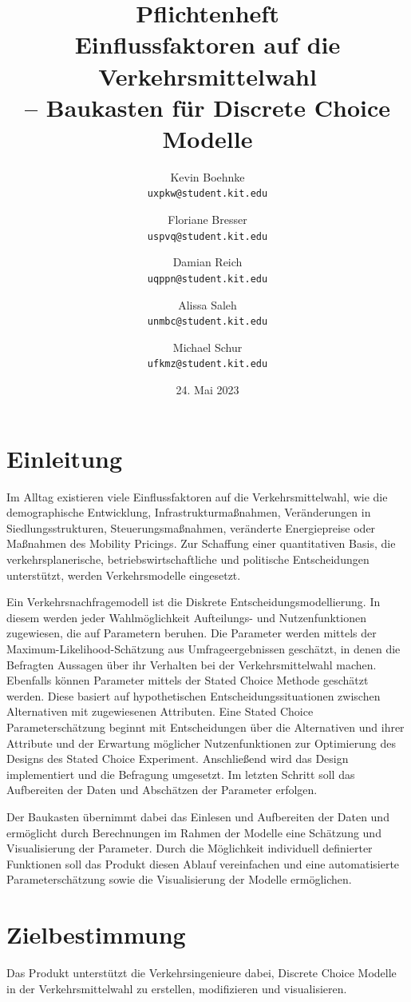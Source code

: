 \documentclass{article}
\title{Pflichtenheft \\ \large Einflussfaktoren auf die Verkehrsmittelwahl\\ -- Baukasten für Discrete Choice Modelle}
\author{Kevin Boehnke \\ \texttt{uxpkw@student.kit.edu}
\and Floriane Bresser \\ \texttt{uspvq@student.kit.edu}
\and Damian Reich \\ \texttt{uqppn@student.kit.edu}
\and Alissa Saleh \\ \texttt{unmbc@student.kit.edu}
\and Michael Schur \\ \texttt{ufkmz@student.kit.edu}}
\date{24. Mai 2023}
\begin{document}
\clearpage\maketitle\thispagestyle{empty}
\newpage
\clearpage\tableofcontents\thispagestyle{empty}
\newpage
{}

\section{Einleitung}

Im Alltag existieren viele Einflussfaktoren auf die Verkehrsmittelwahl, wie die demographische Entwicklung, Infrastrukturmaßnahmen, Veränderungen in Siedlungsstrukturen, Steuerungsmaßnahmen, veränderte Energiepreise oder Maßnahmen des Mobility Pricings. Zur Schaffung einer quantitativen Basis, die verkehrsplanerische, betriebswirtschaftliche und politische Entscheidungen unterstützt, werden Verkehrsmodelle eingesetzt.\newline

Ein Verkehrsnachfragemodell ist die Diskrete Entscheidungsmodellierung. In diesem werden jeder Wahlmöglichkeit Aufteilungs- und Nutzenfunktionen zugewiesen, die auf Parametern beruhen. Die Parameter werden mittels der Maximum-Likelihood-Schätzung aus Umfrageergebnissen geschätzt, in denen die Befragten Aussagen über ihr Verhalten bei der Verkehrsmittelwahl machen. Ebenfalls können Parameter mittels der Stated Choice Methode geschätzt werden. Diese basiert auf hypothetischen Entscheidungssituationen zwischen Alternativen mit zugewiesenen Attributen. Eine Stated Choice Parameterschätzung beginnt mit Entscheidungen über die Alternativen und ihrer Attribute und der Erwartung möglicher Nutzenfunktionen zur Optimierung des Designs des Stated Choice Experiment. Anschließend wird das Design implementiert und die Befragung umgesetzt. Im letzten Schritt soll das Aufbereiten der Daten und Abschätzen der Parameter erfolgen.\newline

Der Baukasten übernimmt dabei das Einlesen und Aufbereiten der Daten und ermöglicht durch Berechnungen im Rahmen der Modelle eine Schätzung und Visualisierung der Parameter. Durch die Möglichkeit individuell definierter Funktionen soll das Produkt diesen Ablauf vereinfachen und eine automatisierte Parameterschätzung sowie die Visualisierung der Modelle ermöglichen. 

\newpage
\section{Zielbestimmung}
Das Produkt unterstützt die Verkehrsingenieure dabei, Discrete Choice Modelle in der Verkehrsmittelwahl zu erstellen, modifizieren und visualisieren.
\end{document}
